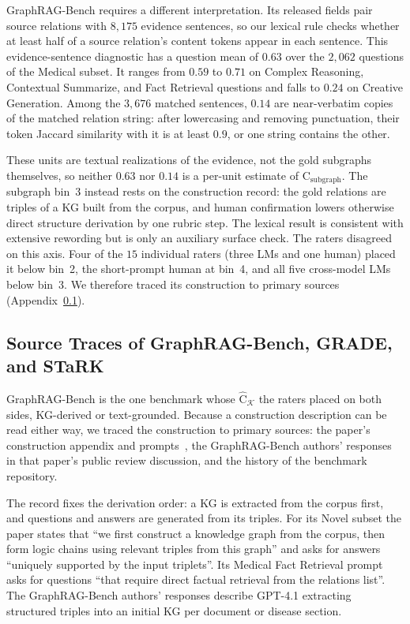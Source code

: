 \documentclass[11pt]{article}
\newcommand{\C}{\mathrm{C}}
\newcommand{\Chat}{\widehat{\mathrm{C}}}
\newcommand{\kg}{\mathcal{K}}
\begin{document}
GraphRAG-Bench requires a different interpretation. Its released fields pair source relations with $8{,}175$ evidence sentences, so our lexical rule checks whether at least half of a source relation's content tokens appear in each sentence. This evidence-sentence diagnostic has a question mean of $0.63$ over the $2{,}062$ questions of the Medical subset. It ranges from $0.59$ to $0.71$ on Complex Reasoning, Contextual Summarize, and Fact Retrieval questions and falls to $0.24$ on Creative Generation. Among the $3{,}676$ matched sentences, $0.14$ are near-verbatim copies of the matched relation string: after lowercasing and removing punctuation, their token Jaccard similarity with it is at least $0.9$, or one string contains the other.

These units are textual realizations of the evidence, not the gold subgraphs themselves, so neither $0.63$ nor $0.14$ is a per-unit estimate of $\C_{\text{subgraph}}$. The subgraph bin~3 instead rests on the construction record: the gold relations are triples of a KG built from the corpus, and human confirmation lowers otherwise direct structure derivation by one rubric step. The lexical result is consistent with extensive rewording but is only an auxiliary surface check. The raters disagreed on this axis. Four of the $15$ individual raters (three LMs and one human) placed it below bin~2, the short-prompt human at bin~4, and all five cross-model LMs below bin~3. We therefore traced its construction to primary sources (Appendix~\ref{app:grbtrace}).

\subsection{Source Traces of GraphRAG-Bench, GRADE, and STaRK}
\label{app:grbtrace}
GraphRAG-Bench is the one benchmark whose $\Chat_{\kg}$ the raters placed on both sides, KG-derived or text-grounded. Because a construction description can be read either way, we traced the construction to primary sources: the paper's construction appendix and prompts~\citep{graphragbench2025}, the GraphRAG-Bench authors' responses in that paper's public review discussion, and the history of the benchmark repository.

The record fixes the derivation order: a KG is extracted from the corpus first, and questions and answers are generated from its triples. For its Novel subset the paper states that ``we first construct a knowledge graph from the corpus, then form logic chains using relevant triples from this graph'' and asks for answers ``uniquely supported by the input triplets''. Its Medical Fact Retrieval prompt asks for questions ``that require direct factual retrieval from the relations list''. The GraphRAG-Bench authors' responses describe GPT-4.1 extracting structured triples into an initial KG per document or disease section.
\end{document}
